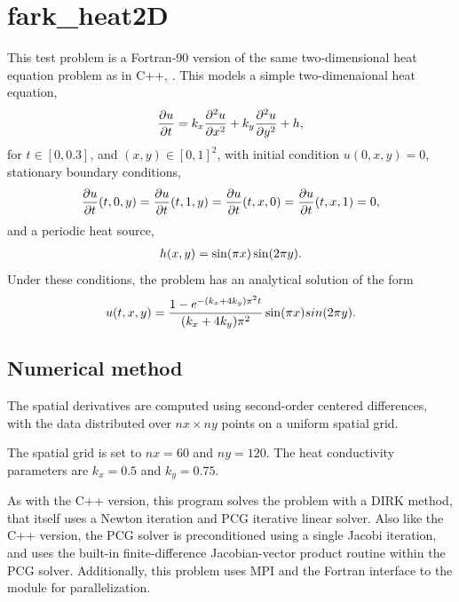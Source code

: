 \documentclass[letterpaper,10pt,english]{sphinxmanual}
\begin{document}
\section{fark\_heat2D}
\label{f90_parallel:fark-heat2d}\label{f90_parallel:id1}
This test problem is a Fortran-90 version of the same two-dimensional
heat equation problem as in C++, {\hyperref[cpp_parallel:ark-heat2d]{\emph{}}}.  This models a
simple two-dimenaional heat equation,
\begin{gather}
\begin{split}\frac{\partial u}{\partial t} = k_x \frac{\partial^2 u}{\partial x^2}
                              + k_y \frac{\partial^2 u}{\partial y^2} + h,\end{split}\notag
\end{gather}
for \(t \in [0, 0.3]\), and \((x,y) \in [0, 1]^2\), with initial
condition \(u(0,x,y) = 0\), stationary boundary conditions,
\begin{gather}
\begin{split}\frac{\partial u}{\partial t}(t,0,y) = \frac{\partial u}{\partial t}(t,1,y) =
\frac{\partial u}{\partial t}(t,x,0) = \frac{\partial u}{\partial t}(t,x,1) = 0,\end{split}\notag
\end{gather}
and a periodic heat source,
\begin{gather}
\begin{split}h(x,y) = \sin(\pi x) \sin(2\pi y).\end{split}\notag
\end{gather}
Under these conditions, the problem has an analytical solution of the
form
\begin{gather}
\begin{split}u(t,x,y) = \frac{1 - e^{-(k_x+4k_y)\pi^2 t}}{(k_x+4k_y)\pi^2} \sin(\pi x) sin(2\pi y).\end{split}\notag
\end{gather}

\subsection{Numerical method}
\label{f90_parallel:numerical-method}
The spatial derivatives are computed using second-order
centered differences, with the data distributed over \(nx\times
ny\) points on a uniform spatial grid.

The spatial grid is set to \(nx=60\) and \(ny=120\).  The heat
conductivity parameters are \(k_x=0.5\) and \(k_y=0.75\).

As with the C++ version, this program solves the problem with a DIRK
method, that itself uses a Newton iteration and PCG iterative linear
solver.  Also like the C++ version, the PCG solver is preconditioned
using a single Jacobi iteration, and uses the built-in
finite-difference Jacobian-vector product routine within the PCG
solver.  Additionally, this problem uses MPI and the Fortran interface
to the  module for parallelization.



\renewcommand{\indexname}{Index}
\printindex
\end{document}
